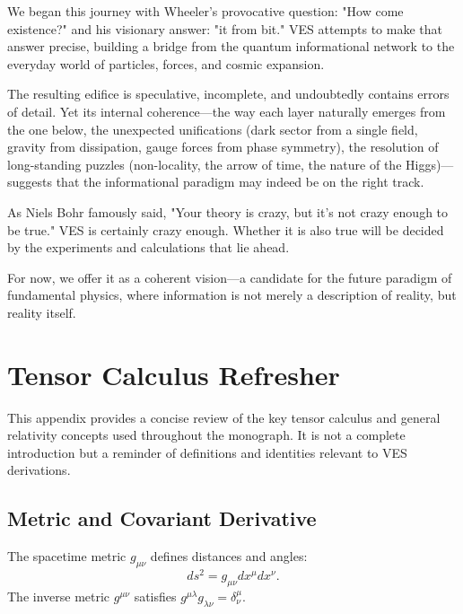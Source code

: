 \documentclass[12pt,a4paper]{book}
\begin{document}
We began this journey with Wheeler's provocative question: "How come existence?" and his visionary answer: "it from bit." VES attempts to make that answer precise, building a bridge from the quantum informational network to the everyday world of particles, forces, and cosmic expansion.

The resulting edifice is speculative, incomplete, and undoubtedly contains errors of detail. Yet its internal coherence—the way each layer naturally emerges from the one below, the unexpected unifications (dark sector from a single field, gravity from dissipation, gauge forces from phase symmetry), the resolution of long-standing puzzles (non-locality, the arrow of time, the nature of the Higgs)—suggests that the informational paradigm may indeed be on the right track.

As Niels Bohr famously said, "Your theory is crazy, but it's not crazy enough to be true." VES is certainly crazy enough. Whether it is also true will be decided by the experiments and calculations that lie ahead.

For now, we offer it as a coherent vision—a candidate for the future paradigm of fundamental physics, where information is not merely a description of reality, but reality itself.

\begin{center}
\end{center}

\appendix

\chapter{Tensor Calculus Refresher}

This appendix provides a concise review of the key tensor calculus and general relativity concepts used throughout the monograph. It is not a complete introduction but a reminder of definitions and identities relevant to VES derivations.

\section{Metric and Covariant Derivative}

The spacetime metric $g_{\mu\nu}$ defines distances and angles:
\begin{equation}
    ds^2 = g_{\mu\nu} dx^\mu dx^\nu.
\end{equation}
The inverse metric $g^{\mu\nu}$ satisfies $g^{\mu\lambda} g_{\lambda\nu} = \delta^\mu_\nu$.
\end{document}

